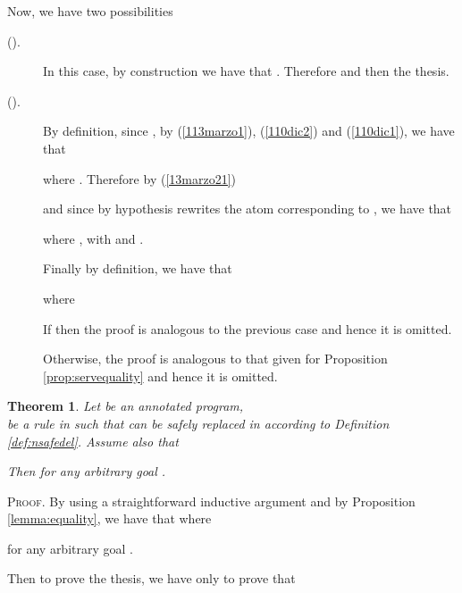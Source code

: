 \documentclass[final]{acmtrans2e}
\newtheorem{theorem}{Theorem}[section]
\begin{document}
Now, we have two possibilities
\begin{description}
  \item[().] In this case, by construction we have that . Therefore  and then the thesis.
  \item[().]
  By definition, since
, by (\ref{113marzo1}), (\ref{110dic2}) and (\ref{110dic1}), we have that

where . Therefore
by (\ref{13marzo21})


and since by hypothesis  rewrites the atom  corresponding to , we have that

     where
     , with
      and .

    Finally by definition, we have that

  where
  

  If  then the proof is analogous to the previous case and hence it is omitted.

  Otherwise, the proof is analogous to that given for Proposition \ref{prop:servequality} and hence it is omitted.
\end{description}
\noindent{}


\begin{theorem}\label{lemma:n1completeness}
Let  be an annotated program, \\  be a rule in  such that
 can be safely replaced
in  according to Definition \ref{def:nsafedel}. Assume also that


Then  for any arbitrary
goal .
\end{theorem}

\textsc{Proof.} By using a straightforward inductive argument and by
Proposition \ref{lemma:equality}, we have that
 where
 
for any arbitrary goal .

Then to prove the thesis, we have only to prove that
\end{document}
